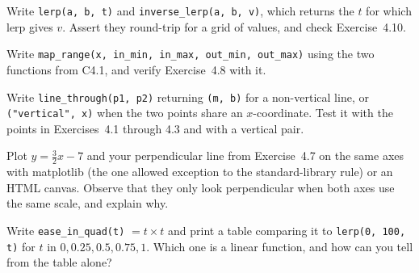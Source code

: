 \begin{codeexercises}
\item Write \lstinline!lerp(a, b, t)! and \lstinline!inverse_lerp(a, b, v)!, which returns the $t$ for which lerp gives $v$. Assert they round-trip for a grid of values, and check Exercise~4.10.
\item Write \lstinline!map_range(x, in_min, in_max, out_min, out_max)! using the two functions from C4.1, and verify Exercise~4.8 with it.
\item Write \lstinline!line_through(p1, p2)! returning \lstinline!(m, b)! for a non-vertical line, or \lstinline!("vertical", x)! when the two points share an $x$-coordinate. Test it with the points in Exercises~4.1 through 4.3 and with a vertical pair.
\item Plot $y = \tfrac{3}{2}x - 7$ and your perpendicular line from Exercise~4.7 on the same axes with matplotlib (the one allowed exception to the standard-library rule) or an HTML canvas. Observe that they only look perpendicular when both axes use the same scale, and explain why.
\item Write \lstinline!ease_in_quad(t)! $= t \times t$ and print a table comparing it to \lstinline!lerp(0, 100, t)! for $t$ in $0, 0.25, 0.5, 0.75, 1$. Which one is a linear function, and how can you tell from the table alone?
\end{codeexercises}
